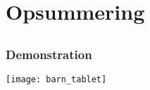 \section{Opsummering}
\subsection{}
\begin{frame}
\frametitle{Demonstration}
\begin{center}
\texttt{[image: barn\_tablet]}
\end{center}
\end{frame}